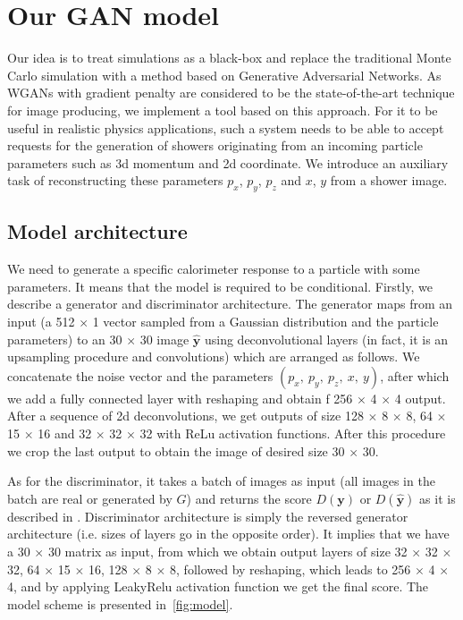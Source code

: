 \section{Our GAN model} \label{sec:model}
Our idea is to treat simulations as a black-box and replace the traditional Monte Carlo simulation with a method based on Generative Adversarial Networks. As WGANs with gradient penalty are considered to be the state-of-the-art technique for image producing, we implement a tool based on this approach. For it to be useful in realistic physics applications, such a system needs to be able to accept requests for the generation of showers originating from an incoming particle parameters such as 3d momentum and 2d coordinate. We introduce an auxiliary task of reconstructing these parameters $p_x$, $p_y$, $p_z$ and $x$, $y$ from a shower image.

\subsection{Model architecture}



We need to generate a specific calorimeter response to a particle with some parameters. It means that the model is required to be conditional.
Firstly, we describe a generator and discriminator architecture. The generator maps from an input (a 512 $\times$ 1 vector sampled from a Gaussian distribution and the particle parameters) to an 30 $\times$ 30 image $\hat{\textbf{y}}$ using deconvolutional layers (in fact, it is an upsampling procedure and convolutions) which are arranged as follows. We concatenate the noise vector and the parameters $(p_x,~ p_y,~ p_z,~ x,~ y)$, after which we add a fully connected layer with reshaping and obtain f 256 $\times$ 4 $\times$ 4 output. After a sequence of 2d deconvolutions, we get outputs of size  128 $\times$ 8 $\times$ 8, 64 $\times$ 15 $\times$ 16 and 32 $\times$ 32 $\times$ 32  with ReLu activation functions. After this procedure we crop the last output to obtain the image of desired size 30 $\times$ 30.

As for the discriminator, it takes a batch of images as input (all images in the batch are real or generated by $G$) and returns the score $D(\textbf{y})$ or $D(\hat{\textbf{y}})$ as it is described in \cite{arjovsky2017wasserstein}. Discriminator architecture is simply the reversed generator architecture (i.e. sizes of layers go in the opposite order). It implies that we have a 30 $\times$ 30 matrix as input, from which we obtain output layers of size 32 $\times$ 32 $\times$ 32, 64 $\times$ 15 $\times$ 16, 128 $\times$ 8 $\times$  8, followed by reshaping, which  leads to 256 $\times$ 4 $\times$ 4, and by applying LeakyRelu activation function we get the final score. The model scheme is presented in~\cref{fig:model}.


